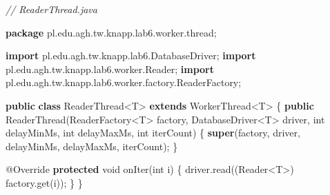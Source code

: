 \documentclass[11pt]{article}
\newenvironment{Shaded}{}{}
\newcommand{\KeywordTok}[1]{\textcolor[rgb]{0.00,0.44,0.13}{\textbf{{#1}}}}
\newcommand{\DataTypeTok}[1]{\textcolor[rgb]{0.56,0.13,0.00}{{#1}}}
\newcommand{\CommentTok}[1]{\textcolor[rgb]{0.38,0.63,0.69}{\textit{{#1}}}}
\newcommand{\FunctionTok}[1]{\textcolor[rgb]{0.02,0.16,0.49}{{#1}}}
\newcommand{\NormalTok}[1]{{#1}}
\newcommand{\ImportTok}[1]{{#1}}
\newcommand{\OperatorTok}[1]{\textcolor[rgb]{0.40,0.40,0.40}{{#1}}}
\newcommand{\BuiltInTok}[1]{{#1}}
\newcommand{\AttributeTok}[1]{\textcolor[rgb]{0.49,0.56,0.16}{{#1}}}
\begin{document}
\begin{Shaded}
\begin{Highlighting}[]
\CommentTok{// ReaderThread.java}

\KeywordTok{package}\ImportTok{ pl}\OperatorTok{.}\ImportTok{edu}\OperatorTok{.}\ImportTok{agh}\OperatorTok{.}\ImportTok{tw}\OperatorTok{.}\ImportTok{knapp}\OperatorTok{.}\ImportTok{lab6}\OperatorTok{.}\ImportTok{worker}\OperatorTok{.}\ImportTok{thread}\OperatorTok{;}

\KeywordTok{import} \ImportTok{pl}\OperatorTok{.}\ImportTok{edu}\OperatorTok{.}\ImportTok{agh}\OperatorTok{.}\ImportTok{tw}\OperatorTok{.}\ImportTok{knapp}\OperatorTok{.}\ImportTok{lab6}\OperatorTok{.}\ImportTok{DatabaseDriver}\OperatorTok{;}
\KeywordTok{import} \ImportTok{pl}\OperatorTok{.}\ImportTok{edu}\OperatorTok{.}\ImportTok{agh}\OperatorTok{.}\ImportTok{tw}\OperatorTok{.}\ImportTok{knapp}\OperatorTok{.}\ImportTok{lab6}\OperatorTok{.}\ImportTok{worker}\OperatorTok{.}\ImportTok{Reader}\OperatorTok{;}
\KeywordTok{import} \ImportTok{pl}\OperatorTok{.}\ImportTok{edu}\OperatorTok{.}\ImportTok{agh}\OperatorTok{.}\ImportTok{tw}\OperatorTok{.}\ImportTok{knapp}\OperatorTok{.}\ImportTok{lab6}\OperatorTok{.}\ImportTok{worker}\OperatorTok{.}\ImportTok{factory}\OperatorTok{.}\ImportTok{ReaderFactory}\OperatorTok{;}

\KeywordTok{public} \KeywordTok{class}\NormalTok{ ReaderThread}\OperatorTok{\textless{}}\NormalTok{T}\OperatorTok{\textgreater{}} \KeywordTok{extends}\NormalTok{ WorkerThread}\OperatorTok{\textless{}}\NormalTok{T}\OperatorTok{\textgreater{}} \OperatorTok{\{}
    \KeywordTok{public} \FunctionTok{ReaderThread}\OperatorTok{(}\NormalTok{ReaderFactory}\OperatorTok{\textless{}}\NormalTok{T}\OperatorTok{\textgreater{}}\NormalTok{ factory}\OperatorTok{,}\NormalTok{ DatabaseDriver}\OperatorTok{\textless{}}\NormalTok{T}\OperatorTok{\textgreater{}}\NormalTok{ driver}\OperatorTok{,}
                        \DataTypeTok{int}\NormalTok{ delayMinMs}\OperatorTok{,} \DataTypeTok{int}\NormalTok{ delayMaxMs}\OperatorTok{,} \DataTypeTok{int}\NormalTok{ iterCount}\OperatorTok{)}
    \OperatorTok{\{}
        \KeywordTok{super}\OperatorTok{(}\NormalTok{factory}\OperatorTok{,}\NormalTok{ driver}\OperatorTok{,}\NormalTok{ delayMinMs}\OperatorTok{,}\NormalTok{ delayMaxMs}\OperatorTok{,}\NormalTok{ iterCount}\OperatorTok{);}
    \OperatorTok{\}}

    \AttributeTok{@Override}
    \KeywordTok{protected} \DataTypeTok{void} \FunctionTok{onIter}\OperatorTok{(}\DataTypeTok{int}\NormalTok{ i}\OperatorTok{)} \OperatorTok{\{}
\NormalTok{        driver}\OperatorTok{.}\FunctionTok{read}\OperatorTok{((}\BuiltInTok{Reader}\OperatorTok{\textless{}}\NormalTok{T}\OperatorTok{\textgreater{})}\NormalTok{ factory}\OperatorTok{.}\FunctionTok{get}\OperatorTok{(}\NormalTok{i}\OperatorTok{));}
    \OperatorTok{\}}
\OperatorTok{\}}
\end{Highlighting}
\end{Shaded}
\end{document}

